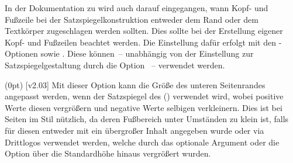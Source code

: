 \begin{DeclareEntity*}{}
\begin{DeclareEntity*}{}
\begin{DeclareEntity*}{}
In der Dokumentation zu  wird auch darauf eingegangen, wann 
Kopf- und Fußzeile bei der Satzspiegelkonstruktion entweder dem Rand oder dem 
Textkörper zugeschlagen werden sollten. Dies sollte bei der Erstellung eigener 
Kopf- und Fußzeilen beachtet werden. Die Einstellung dafür erfolgt mit den 
\KOMAScript-Optionen  
sowie . Diese können~-- 
unabhängig von der Einstellung zur Satzspiegelgestaltung durch die Option 
~-- verwendet werden.

\begin{Declaration}
  {}
  (0pt)
  [v2.03]
\printdeclarationlist
%
Mit dieser Option kann die Größe des unteren Seitenrandes angepasst werden, 
wenn der Satzspiegel des \CDs () 
verwendet wird, wobei positive Werte diesen vergrößern und negative Werte 
selbigen verkleinern. Dies ist bei Seiten im Stil  
nützlich, da deren Fußbereich unter Umständen zu klein ist, falls für diesen 
entweder mit  ein übergroßer Inhalt angegeben wurde oder via 
 Drittlogos verwendet werden, welche durch das optionale 
Argument oder die Option  über die Standardhöhe hinaus 
vergrößert wurden. 
\end{Declaration}




\end{DeclareEntity*}
\end{DeclareEntity*}
\end{DeclareEntity*}
